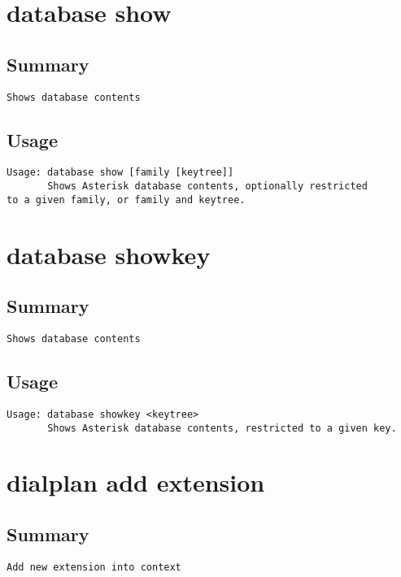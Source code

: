 \section{database show}
\subsection{Summary}
\begin{verbatim}
Shows database contents
\end{verbatim}
\subsection{Usage}
\begin{verbatim}
Usage: database show [family [keytree]]
       Shows Asterisk database contents, optionally restricted
to a given family, or family and keytree.

\end{verbatim}


\section{database showkey}
\subsection{Summary}
\begin{verbatim}
Shows database contents
\end{verbatim}
\subsection{Usage}
\begin{verbatim}
Usage: database showkey <keytree>
       Shows Asterisk database contents, restricted to a given key.

\end{verbatim}


\section{dialplan add extension}
\subsection{Summary}
\begin{verbatim}
Add new extension into context
\end{verbatim}
